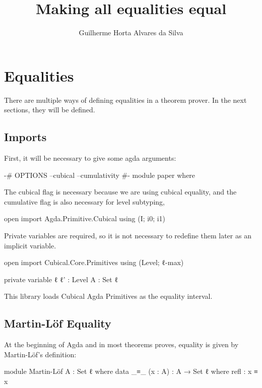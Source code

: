 \documentclass{article}
\author{Guilherme Horta Alvares da Silva}
\title{Making all equalities equal}
\begin{document}
\maketitle

\begin{abstract}

\end{abstract}


\section{Equalities}

There are multiple ways of defining equalities in a theorem prover.
In the next sections, they will be defined.

\subsection{Imports}

First, it will be necessary to give some agda arguments:

\begin{code}
{-# OPTIONS --cubical --cumulativity #-}
module paper where
\end{code}

The cubical flag is necessary because we are using cubical equality,
and the cumulative flag is also necessary for level subtyping,

\begin{code}
open import Agda.Primitive.Cubical using (I; i0; i1)
\end{code}

Private variables are required, so it is not necessary to redefine them later as an implicit variable.

\begin{code}
open import Cubical.Core.Primitives using (Level; ℓ-max)

private variable
  ℓ ℓ' : Level
  A : Set ℓ
\end{code}

This library loads Cubical Agda Primitives as the equality interval.

\subsection{Martin-Löf Equality}

At the beginning of Agda and in most theorems proves, equality is given by Martin-Löf's definition:

\begin{code}
module Martin-Löf {A : Set ℓ} where
  data _≡_ (x : A) : A → Set ℓ where
    refl : x ≡ x
\end{code}
\end{document}
